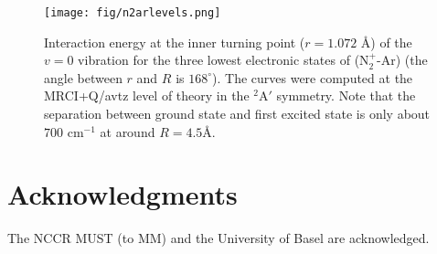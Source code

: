 \documentclass[journal=jacsat,manuscript=article]{achemso}
\begin{document}
\begin{figure}
\texttt{[image: fig/n2arlevels.png]}
\caption{Interaction energy at the inner turning point ($r = 1.072$
  \AA\/) of the $v = 0$ vibration for the three lowest electronic
  states of (N$_2^+$-Ar) (the angle between $r$ and $R$ is
  $168^{\circ}$). The curves were computed at the MRCI+Q/avtz level of
  theory in the $^2$A$'$ symmetry. Note that the separation between
  ground state and first excited state is only about $700$ cm$^{-1}$
  at around $R=4.5$\AA\/.}
\label{fig:n2arlevels}
\end{figure}
    
\section*{Acknowledgments}
The NCCR MUST (to MM) and the University of Basel are acknowledged.



\end{document}
